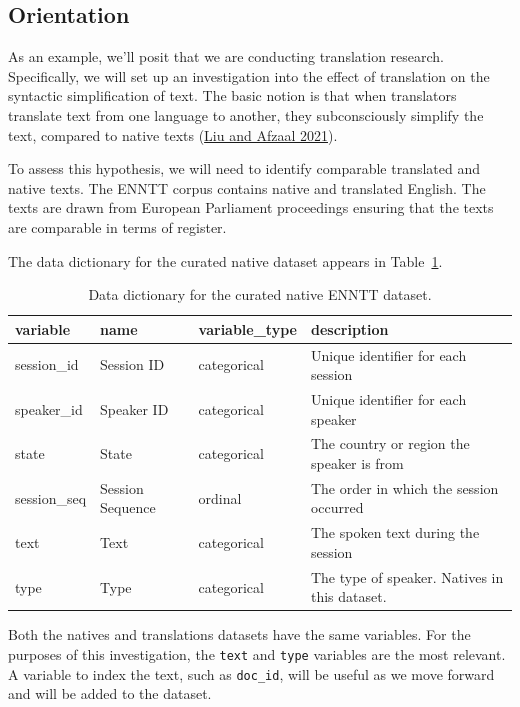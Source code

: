\documentclass[
  letterpaper,
  DIV=11,
  numbers=noendperiod]{scrreport}
\theoremstyle{definition}
\theoremstyle{remark}
\begin{document}
\hypertarget{sec-td-generation-orientation}{%
\subsection{Orientation}\label{sec-td-generation-orientation}}

As an example, we'll posit that we are conducting translation research.
Specifically, we will set up an investigation into the effect of
translation on the syntactic simplification of text. The basic notion is
that when translators translate text from one language to another, they
subconsciously simplify the text, compared to native texts
(\protect\hyperlink{ref-Liu2021}{Liu and Afzaal 2021}).

To assess this hypothesis, we will need to identify comparable
translated and native texts. The ENNTT corpus contains native and
translated English. The texts are drawn from European Parliament
proceedings ensuring that the texts are comparable in terms of register.

The data dictionary for the curated native dataset appears in
Table~\ref{tbl-td-enntt-native-dd}.

\hypertarget{tbl-td-enntt-native-dd}{}
\begin{table}
\caption{\label{tbl-td-enntt-native-dd}Data dictionary for the curated native ENNTT dataset. }\tabularnewline

\centering
\begin{tabular}{l|l|l|l}
\hline
variable & name & variable\_type & description\\
\hline
session\_id & Session ID & categorical & Unique identifier for each session\\
\hline
speaker\_id & Speaker ID & categorical & Unique identifier for each speaker\\
\hline
state & State & categorical & The country or region the speaker is from\\
\hline
session\_seq & Session Sequence & ordinal & The order in which the session occurred\\
\hline
text & Text & categorical & The spoken text during the session\\
\hline
type & Type & categorical & The type of speaker. Natives in this dataset.\\
\hline
\end{tabular}
\end{table}

Both the natives and translations datasets have the same variables. For
the purposes of this investigation, the \texttt{text} and \texttt{type}
variables are the most relevant. A variable to index the text, such as
\texttt{doc\_id}, will be useful as we move forward and will be added to
the dataset.
\end{document}

